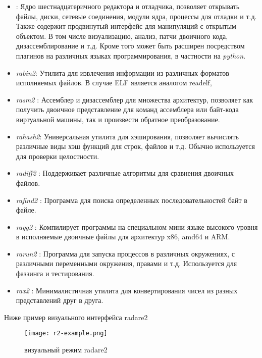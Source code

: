 \begin{itemize}
\item {}: Ядро шестнадцатеричного редактора и отладчика, позволяет открывать файлы, диски, сетевые соединения, модули ядра, процессы для отладки и т.д. Также содержит продвинутый интерфейс для манипуляций с открытым объектом. В том числе визуализацию, анализ, патчи двоичного кода, дизассемблирование и т.д. Кроме того может быть расширен посредством плагинов на различных языках программирования, в частности на {\em python}.

\item {\em rabin2}: Утилита для извлечения информации из различных форматов исполняемых файлов.
В случае ELF является аналогом readelf,

\item {\em rasm2 }: Ассемблер и дизассемблер для множества архитектур, позволяет как получить двоичное представление для команд ассемблера или байт-кода виртуальной машины, так и произвести обратное преобразование.

\item {\em rahash2}: Универсальная утилита для хэширования, позволяет вычислять различные виды хэш функций для строк, файлов и т.д. Обычно используется для проверки целостности.

\item {\em radiff2 }: Поддерживает различные алгоритмы для сравнения двоичных файлов.

\item {\em rafind2 }: Программа для поиска определенных последовательностей байт в файле.

\item {\em ragg2 }: Компилирует программы на специальном мини языке высокого уровня в исполняемые двоичные файлы для архитектур x86, amd64 и ARM.

\item {\em rarun2 }: Программа для запуска процессов в различных окружениях, с различными переменными окружения, правами и т.д. Используется для фаззинга и тестирования.

\item {\em rax2 }: Минималистичная утилита для конвертирования чисел из разных представлений друг в друга.

\end{itemize}

Ниже пример визуального интерфейса radare2

\begin{figure}[h]
\centering
\texttt{[image: r2-example.png]}
\caption{визуальный режим radare2}
\label{fig:r2a}
\end{figure}

